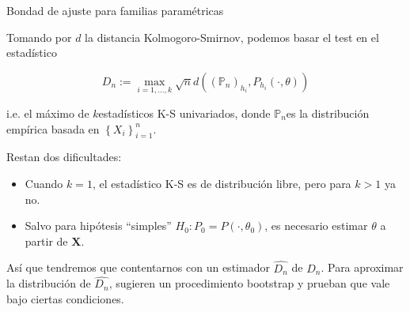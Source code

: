 \documentclass[10pt,spanish,handout]{beamer}\usepackage[]{graphicx}\usepackage[]{color}
\begin{document}
\begin{frame}{Bondad de ajuste para familias paramétricas}

Tomando por $d$ la distancia Kolmogoro-Smirnov, podemos basar el
test en el estadístico

\[
D_{n}:=\max_{i=1,\ldots,k}\sqrt{n}d\left(\left(\mathbb{P}_{n}\right)_{h_{i}},P_{h_{i}}(\cdot,\theta)\right)
\]

i.e. el máximo de $k$estadísticos K-S univariados, donde $\mathbb{P}_{n}$es
la distribución empírica basada en $\left\{ X_{i}\right\} _{i=1}^{n}$.

\pause{}

Restan dos dificultades:
\begin{itemize}
\item Cuando $k=1$, el estadístico K-S es de distribución libre, pero para
$k>1$ ya no.
\end{itemize}

\pause{}
\begin{itemize}
\item Salvo para hipótesis “simples” $H_{0}:P_{0}=P\left(\cdot,\theta_{0}\right)$,
es necesario estimar $\theta$ a partir de $\mathbf{X}$.
\end{itemize}

\pause{}

Así que tendremos que contentarnos con un estimador $\hat{D_{n}}$
de $D_{n}$. Para aproximar la distribución de $\hat{D_{n}}$, sugieren
un procedimiento bootstrap y prueban que vale bajo ciertas condiciones.
\end{frame}
%
\end{document}
